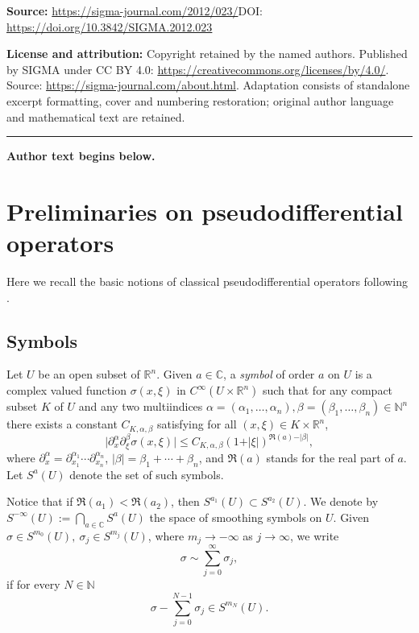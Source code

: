\documentclass[11pt]{article}
\begin{document}
\noindent\textbf{Source:} \url{https://sigma-journal.com/2012/023/}\quad DOI: \url{https://doi.org/10.3842/SIGMA.2012.023}\par
\noindent\textbf{License and attribution:} Copyright retained by the named authors. Published by SIGMA under CC BY 4.0: \url{https://creativecommons.org/licenses/by/4.0/}. Source: \url{https://sigma-journal.com/about.html}. Adaptation consists of standalone excerpt formatting, cover and numbering restoration; original author language and mathematical text are retained.\par
\medskip\hrule\medskip\noindent\textbf{Author text begins below.}\par
\setcounter{section}{1}
\setcounter{subsection}{0}
\setcounter{subsubsection}{0}
\setcounter{equation}{1}
\section{Preliminaries on pseudodif\/ferential operators}\label{section2}

Here we recall the basic notions of classical pseudodif\/ferential operators following \cite{Shubin}.

\subsection{Symbols}

Let $U$ be an open subset of $\mathbb{R}^n$. Given $a\in\mathbb{C}$, a {\it symbol} of order $a$ on $U$ is a complex valued function $\sigma(x,\xi)$ in $C^{\infty}(U\times\mathbb{R}^n)$ such that for any compact subset $K$ of $U$ and any two multiindices $\alpha=(\alpha_1,\dots,\alpha_n), \beta=(\beta_1,\dots,\beta_n) \in \mathbb{N}^n$ there exists a constant $C_{K, \alpha, \beta}$ satisfying for all $(x,\xi)\in K\times\mathbb{R}^n$,
\[
\big| \partial_x^{\alpha}\partial_{\xi}^{\beta}\sigma(x,\xi) \big| \leq C_{K, \alpha, \beta}(1+ \vert \xi \vert )^{\Re(a)- \vert \beta\vert},
\]
where $\partial_x^{\alpha}=\partial_{x_1}^{\alpha_1}\cdots\partial_{x_n}^{\alpha_n}$, $\vert \beta\vert = \beta_1+\cdots+\beta_n$, and $\Re(a)$ stands for the real part of $a$. Let $S^{a}(U)$ denote the set of such symbols.

Notice that if $\Re(a_1)<\Re(a_2)$, then $S^{a_1}(U)\subset S^{a_2}(U)$. We denote by $S^{-\infty}(U):= \bigcap\limits_{a \in \mathbb{C}}S^a(U)$ the space of smoothing symbols on $U$. Given $\sigma\in S^{m_0}(U),\ \sigma_j\in S^{m_j}(U)$, where $m_j\to-\infty$ as $j\to\infty$, we write
\[
\sigma\sim\sum_{j=0}^\infty\sigma_j,
\]
if for every $N\in\mathbb{N}$
\[
\sigma-\sum_{j=0}^{N-1}\sigma_j\in S^{m_N}(U).
\]
\end{document}
